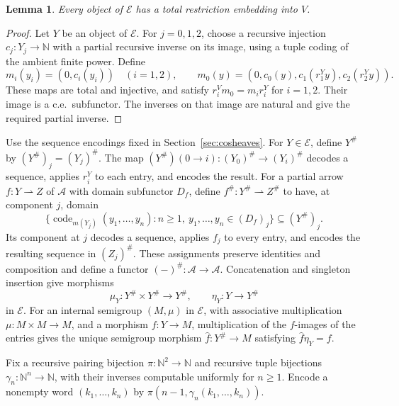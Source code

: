 \documentclass[11pt]{article}
\newtheorem{lemma}[theorem]{Lemma}
\newcommand{\N}{\mathbb N}
\begin{document}
\begin{lemma}\label{lem:fork-dominance}
Every object of $\mathcal E$ has a total restriction embedding
into $V$.
\end{lemma}
\begin{proof}
Let $Y$ be an object of $\mathcal E$. For $j=0,1,2$, choose a
recursive injection $c_j:Y_j\to\N$
with a partial recursive inverse on its image, using a tuple
coding of the ambient finite power. Define
\[
 m_i(y_i)=(0,c_i(y_i))\quad(i=1,2),\qquad
 m_0(y)=(0,c_0(y),c_1(r_1^Yy),c_2(r_2^Yy)).
\]
These maps are total and injective, and satisfy
$r_i^Vm_0=m_i r_i^Y$ for $i=1,2$.
Their image is a c.e.\ subfunctor. The inverses on that image
are natural and give the required partial inverse.
\end{proof}

Use the sequence encodings fixed in Section~\ref{sec:cosheaves}.
For $Y\in\mathcal E$, define $Y^\#$ by
$(Y^\#)_j=(Y_j)^\#$.
The map $(Y^\#)(0\to i):(Y_0)^\#\to(Y_i)^\#$ decodes a sequence,
applies $r_i^Y$ to each entry, and encodes the result.
For a partial arrow $f:Y\rightharpoonup Z$ of $\mathcal A$
with domain subfunctor $D_f$, define
$f^\#:Y^\#\rightharpoonup Z^\#$ to have, at component $j$, domain
\[
 \{\operatorname{code}_{m(Y_j)}(y_1,\ldots,y_n):
          n\ge1,\ y_1,\ldots,y_n\in(D_f)_j\}\subseteq(Y^\#)_j.
\]
Its component at $j$ decodes a sequence, applies $f_j$ to every
entry, and encodes the resulting sequence in $(Z_j)^\#$.
These assignments preserve identities and composition and define
a functor $(-)^\#:\mathcal A\to\mathcal A$.
Concatenation and singleton insertion give morphisms
\[
 \mu_Y:Y^\#\times Y^\#\to Y^\#,
 \qquad \eta_Y:Y\to Y^\#
\]
in $\mathcal E$.
For an internal semigroup $(M,\mu)$ in $\mathcal E$, with
associative multiplication $\mu:M\times M\to M$, and a morphism
$f:Y\to M$, multiplication of the $f$-images of the entries gives
the unique semigroup morphism $\widehat f:Y^\#\to M$ satisfying
$\widehat f\eta_Y=f$.

Fix a recursive pairing bijection
$\pi:\N^2\to\N$ and recursive tuple bijections
$\gamma_n:\N^n\to\N$, with their inverses computable uniformly
for $n\ge1$. Encode a nonempty word $(k_1,\ldots,k_n)$ by
$\pi(n-1,\gamma_n(k_1,\ldots,k_n))$.
\end{document}
